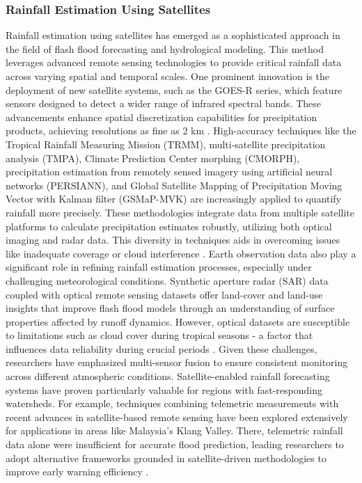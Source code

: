 \subsubsection{Rainfall Estimation Using Satellites}
Rainfall estimation using satellites has emerged as a sophisticated approach in the field of flash flood forecasting and hydrological modeling. This method leverages advanced remote sensing technologies to provide critical rainfall data across varying spatial and temporal scales. One prominent innovation is the deployment of new satellite systems, such as the GOES-R series, which feature sensors designed to detect a wider range of infrared spectral bands. These advancements enhance spatial discretization capabilities for precipitation products, achieving resolutions as fine as 2 km \citep{Zanchetta2020}.
High-accuracy techniques like the Tropical Rainfall Measuring Mission (TRMM), multi-satellite precipitation analysis (TMPA), Climate Prediction Center morphing (CMORPH), precipitation estimation from remotely sensed imagery using artificial neural networks (PERSIANN), and Global Satellite Mapping of Precipitation Moving Vector with Kalman filter (GSMaP-MVK) are increasingly applied to quantify rainfall more precisely. These methodologies integrate data from multiple satellite platforms to calculate precipitation estimates robustly, utilizing both optical imaging and radar data. This diversity in techniques aids in overcoming issues like inadequate coverage or cloud interference \citep{Khan2020}.
Earth observation data also play a significant role in refining rainfall estimation processes, especially under challenging meteorological conditions. Synthetic aperture radar (SAR) data coupled with optical remote sensing datasets offer land-cover and land-use insights that improve flash flood models through an understanding of surface properties affected by runoff dynamics. However, optical datasets are susceptible to limitations such as cloud cover during tropical seasons - a factor that influences data reliability during crucial periods \citep{Nguyen2020}. Given these challenges, researchers have emphasized multi-sensor fusion to ensure consistent monitoring across different atmospheric conditions.
Satellite-enabled rainfall forecasting systems have proven particularly valuable for regions with fast-responding watersheds. For example, techniques combining telemetric measurements with recent advances in satellite-based remote sensing have been explored extensively for applications in areas like Malaysia's Klang Valley. There, telemetric rainfall data alone were insufficient for accurate flood prediction, leading researchers to adopt alternative frameworks grounded in satellite-driven methodologies to improve early warning efficiency \citep{Maqtan2022a}\citep{Maqtan2022b}.
